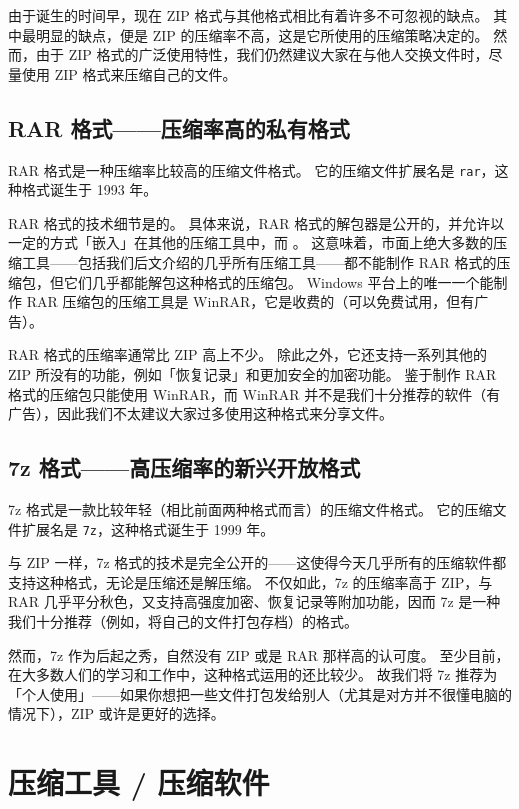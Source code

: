 由于诞生的时间早，现在 ZIP 格式与其他格式相比有着许多不可忽视的缺点。
其中最明显的缺点，便是 ZIP 的压缩率不高，这是它所使用的压缩策略决定的。
然而，由于 ZIP 格式的广泛使用特性，我们仍然建议大家在与他人交换文件时，尽量使用 ZIP 格式来压缩自己的文件。

\subsection{RAR 格式——压缩率高的私有格式}

RAR 格式是一种压缩率比较高的压缩文件格式。
它的压缩文件扩展名是 \verb|rar|，这种格式诞生于 1993 年。

RAR 格式的技术细节是的。
具体来说，RAR 格式的解包器是公开的，并允许以一定的方式「嵌入」在其他的压缩工具中，而 。
这意味着，市面上绝大多数的压缩工具——包括我们后文介绍的几乎所有压缩工具——都不能制作 RAR 格式的压缩包，但它们几乎都能解包这种格式的压缩包。
Windows 平台上的唯一一个能制作 RAR 压缩包的压缩工具是 WinRAR，它是收费的（可以免费试用，但有广告）。

RAR 格式的压缩率通常比 ZIP 高上不少。
除此之外，它还支持一系列其他的 ZIP 所没有的功能，例如「恢复记录」和更加安全的加密功能。
鉴于制作 RAR 格式的压缩包只能使用 WinRAR，而 WinRAR 并不是我们十分推荐的软件（有广告），因此我们不太建议大家过多使用这种格式来分享文件。

\subsection{7z 格式——高压缩率的新兴开放格式}

7z 格式是一款比较年轻（相比前面两种格式而言）的压缩文件格式。
它的压缩文件扩展名是 \verb|7z|，这种格式诞生于 1999 年。

与 ZIP 一样，7z 格式的技术是完全公开的——这使得今天几乎所有的压缩软件都支持这种格式，无论是压缩还是解压缩。
不仅如此，7z 的压缩率高于 ZIP，与 RAR 几乎平分秋色，又支持高强度加密、恢复记录等附加功能，因而 7z 是一种我们十分推荐（例如，将自己的文件打包存档）的格式。

然而，7z 作为后起之秀，自然没有 ZIP 或是 RAR 那样高的认可度。
至少目前，在大多数人们的学习和工作中，这种格式运用的还比较少。
故我们将 7z 推荐为「个人使用」——如果你想把一些文件打包发给别人（尤其是对方并不很懂电脑的情况下），ZIP 或许是更好的选择。

\section{压缩工具 / 压缩软件}

